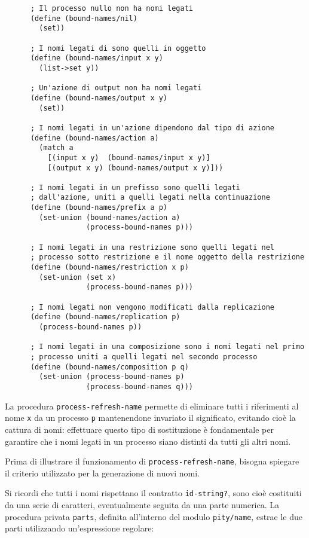\begin{lstlisting}
      ; Il processo nullo non ha nomi legati
      (define (bound-names/nil)
        (set))

      ; I nomi legati di sono quelli in oggetto
      (define (bound-names/input x y)
        (list->set y))

      ; Un'azione di output non ha nomi legati
      (define (bound-names/output x y)
        (set))

      ; I nomi legati in un'azione dipendono dal tipo di azione
      (define (bound-names/action a)
        (match a
          [(input x y)  (bound-names/input x y)]
          [(output x y) (bound-names/output x y)]))

      ; I nomi legati in un prefisso sono quelli legati
      ; dall'azione, uniti a quelli legati nella continuazione
      (define (bound-names/prefix a p)
        (set-union (bound-names/action a)
                   (process-bound-names p)))

      ; I nomi legati in una restrizione sono quelli legati nel
      ; processo sotto restrizione e il nome oggetto della restrizione
      (define (bound-names/restriction x p)
        (set-union (set x)
                   (process-bound-names p)))

      ; I nomi legati non vengono modificati dalla replicazione
      (define (bound-names/replication p)
        (process-bound-names p))

      ; I nomi legati in una composizione sono i nomi legati nel primo
      ; processo uniti a quelli legati nel secondo processo
      (define (bound-names/composition p q)
        (set-union (process-bound-names p)
                   (process-bound-names q)))
\end{lstlisting}

La procedura \lstinline{process-refresh-name} permette di eliminare tutti
i riferimenti al nome \lstinline{x} da un processo \lstinline{p}
mantenendone invariato il significato, evitando cio\`e la cattura di nomi:
effettuare questo tipo di sostituzione \`e fondamentale per garantire che
i nomi legati in un processo siano distinti da tutti gli altri nomi.

Prima di illustrare il funzionamento di \lstinline{process-refresh-name},
bisogna spiegare il criterio utilizzato per la generazione di nuovi nomi.

Si ricordi che tutti i nomi rispettano il contratto \lstinline{id-string?},
sono cio\`e costituiti da una serie di caratteri, eventualmente seguita
da una parte numerica. La procedura privata \lstinline{parts}, definita
all'interno del modulo \lstinline{pity/name}, estrae le due parti
utilizzando un'espressione regolare:

